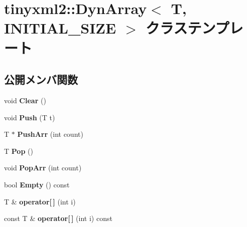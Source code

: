 \hypertarget{classtinyxml2_1_1_dyn_array}{}\section{tinyxml2\+:\+:Dyn\+Array$<$ T, I\+N\+I\+T\+I\+A\+L\+\_\+\+S\+I\+ZE $>$ クラステンプレート}
\label{classtinyxml2_1_1_dyn_array}
\subsection*{公開メンバ関数}
\begin{DoxyCompactItemize}
\item 
\mbox{\label{classtinyxml2_1_1_dyn_array_af87a804cd831226d069274b44b74b8bc}} 
void {\bfseries Clear} ()
\item 
\mbox{\label{classtinyxml2_1_1_dyn_array_aea7ffe983b5d3284bd43171afd7c99d0}} 
void {\bfseries Push} (T t)
\item 
\mbox{\label{classtinyxml2_1_1_dyn_array_ad289abee8cd02b26e215f1b63d2043f1}} 
T $\ast$ {\bfseries Push\+Arr} (int count)
\item 
\mbox{\label{classtinyxml2_1_1_dyn_array_a27a3f2f6f869815b6eabb3ea40cf0712}} 
T {\bfseries Pop} ()
\item 
\mbox{\label{classtinyxml2_1_1_dyn_array_ab8b8c94a2312ab27e2846f0d61ef677a}} 
void {\bfseries Pop\+Arr} (int count)
\item 
\mbox{\label{classtinyxml2_1_1_dyn_array_a044fc26f44ed3e96ffaeac542188149e}} 
bool {\bfseries Empty} () const
\item 
\mbox{\label{classtinyxml2_1_1_dyn_array_a756cf4e7464c711aa720e2b17a251daa}} 
T \& {\bfseries operator\mbox{[}$\,$\mbox{]}} (int i)
\item 
\mbox{\label{classtinyxml2_1_1_dyn_array_a474a5cd9bc97ea32b3dcef4c773125e1}} 
const T \& {\bfseries operator\mbox{[}$\,$\mbox{]}} (int i) const

\end{DoxyCompactItemize}

